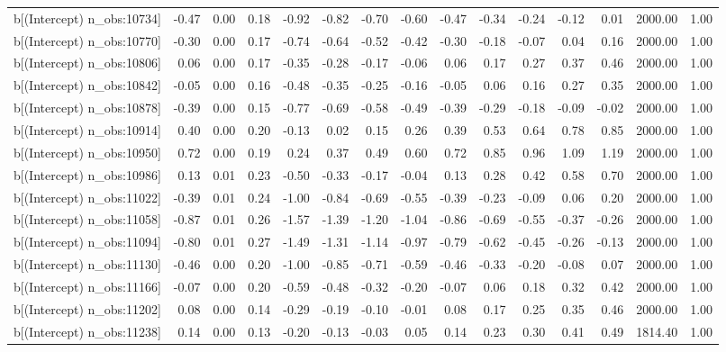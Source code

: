 \begin{table}[ht]
\begin{tabular}{rrrrrrrrrrrrrrr}
  b[(Intercept) n\_obs:10734] & -0.47 & 0.00 & 0.18 & -0.92 & -0.82 & -0.70 & -0.60 & -0.47 & -0.34 & -0.24 & -0.12 & 0.01 & 2000.00 & 1.00 \\ 
  b[(Intercept) n\_obs:10770] & -0.30 & 0.00 & 0.17 & -0.74 & -0.64 & -0.52 & -0.42 & -0.30 & -0.18 & -0.07 & 0.04 & 0.16 & 2000.00 & 1.00 \\ 
  b[(Intercept) n\_obs:10806] & 0.06 & 0.00 & 0.17 & -0.35 & -0.28 & -0.17 & -0.06 & 0.06 & 0.17 & 0.27 & 0.37 & 0.46 & 2000.00 & 1.00 \\ 
  b[(Intercept) n\_obs:10842] & -0.05 & 0.00 & 0.16 & -0.48 & -0.35 & -0.25 & -0.16 & -0.05 & 0.06 & 0.16 & 0.27 & 0.35 & 2000.00 & 1.00 \\ 
  b[(Intercept) n\_obs:10878] & -0.39 & 0.00 & 0.15 & -0.77 & -0.69 & -0.58 & -0.49 & -0.39 & -0.29 & -0.18 & -0.09 & -0.02 & 2000.00 & 1.00 \\ 
  b[(Intercept) n\_obs:10914] & 0.40 & 0.00 & 0.20 & -0.13 & 0.02 & 0.15 & 0.26 & 0.39 & 0.53 & 0.64 & 0.78 & 0.85 & 2000.00 & 1.00 \\ 
  b[(Intercept) n\_obs:10950] & 0.72 & 0.00 & 0.19 & 0.24 & 0.37 & 0.49 & 0.60 & 0.72 & 0.85 & 0.96 & 1.09 & 1.19 & 2000.00 & 1.00 \\ 
  b[(Intercept) n\_obs:10986] & 0.13 & 0.01 & 0.23 & -0.50 & -0.33 & -0.17 & -0.04 & 0.13 & 0.28 & 0.42 & 0.58 & 0.70 & 2000.00 & 1.00 \\ 
  b[(Intercept) n\_obs:11022] & -0.39 & 0.01 & 0.24 & -1.00 & -0.84 & -0.69 & -0.55 & -0.39 & -0.23 & -0.09 & 0.06 & 0.20 & 2000.00 & 1.00 \\ 
  b[(Intercept) n\_obs:11058] & -0.87 & 0.01 & 0.26 & -1.57 & -1.39 & -1.20 & -1.04 & -0.86 & -0.69 & -0.55 & -0.37 & -0.26 & 2000.00 & 1.00 \\ 
  b[(Intercept) n\_obs:11094] & -0.80 & 0.01 & 0.27 & -1.49 & -1.31 & -1.14 & -0.97 & -0.79 & -0.62 & -0.45 & -0.26 & -0.13 & 2000.00 & 1.00 \\ 
  b[(Intercept) n\_obs:11130] & -0.46 & 0.00 & 0.20 & -1.00 & -0.85 & -0.71 & -0.59 & -0.46 & -0.33 & -0.20 & -0.08 & 0.07 & 2000.00 & 1.00 \\ 
  b[(Intercept) n\_obs:11166] & -0.07 & 0.00 & 0.20 & -0.59 & -0.48 & -0.32 & -0.20 & -0.07 & 0.06 & 0.18 & 0.32 & 0.42 & 2000.00 & 1.00 \\ 
  b[(Intercept) n\_obs:11202] & 0.08 & 0.00 & 0.14 & -0.29 & -0.19 & -0.10 & -0.01 & 0.08 & 0.17 & 0.25 & 0.35 & 0.46 & 2000.00 & 1.00 \\ 
  b[(Intercept) n\_obs:11238] & 0.14 & 0.00 & 0.13 & -0.20 & -0.13 & -0.03 & 0.05 & 0.14 & 0.23 & 0.30 & 0.41 & 0.49 & 1814.40 & 1.00 \\ 

\end{tabular}
\end{table}
